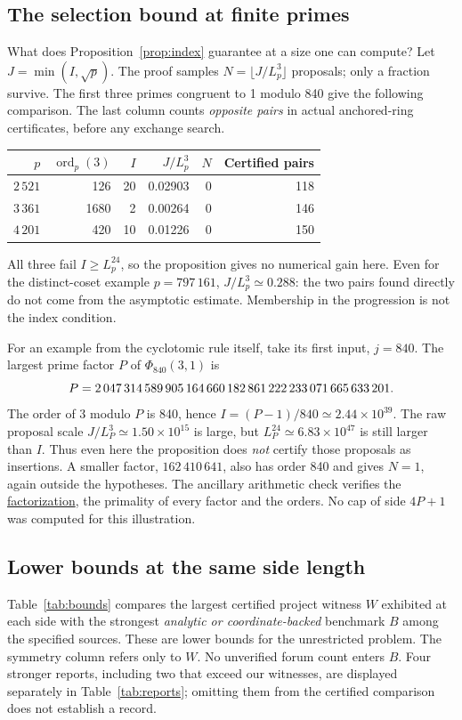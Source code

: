 \subsection{The selection bound at finite primes}\label{sec:scale}
What does Proposition~\ref{prop:index} guarantee at a size one can compute? Let $J=\min(I,\sqrt p)$. The proof samples $N=\lfloor J/L_p^3\rfloor$ proposals; only a fraction survive. The first three primes congruent to 1 modulo 840 give the following comparison. The last column counts \emph{opposite pairs} in actual anchored-ring certificates, before any exchange search.
\begin{center}\small
\begin{tabular}{@{}rrrrrr@{}}\toprule
$p$ & $\operatorname{ord}_p(3)$ & $I$ & $J/L_p^3$ & $N$ & Certified pairs \\ \midrule
$2\,521$ & 126  & 20 & 0.02903 & 0 & 118 \\
$3\,361$ & 1680 &  2 & 0.00264 & 0 & 146 \\
$4\,201$ & 420  & 10 & 0.01226 & 0 & 150 \\ \bottomrule
\end{tabular}\end{center}
All three fail $I\ge L_p^{24}$, so the proposition gives no numerical gain here. Even for the distinct-coset example $p=797\,161$, $J/L_p^3\simeq0.288$: the two pairs found directly do not come from the asymptotic estimate. Membership in the progression is not the index condition.

For an example from the cyclotomic rule itself, take its first input, $j=840$. The largest prime factor $P$ of $\Phi_{840}(3,1)$ is
\[
 \mathcopy{P = 2047314589905164660182861222233071665633201.}{P=2\,047\,314\,589\,905\,164\,660\,182\,861\,222\,233\,071\,665\,633\,201.}
\]
The order of 3 modulo $P$ is 840, hence $I=(P-1)/840\simeq2.44\times10^{39}$. The raw proposal scale $J/L_P^3\simeq1.50\times10^{15}$ is large, but $L_P^{24}\simeq6.83\times10^{47}$ is still larger than $I$. Thus even here the proposition does \emph{not} certify those proposals as insertions. A smaller factor, $162\,410\,641$, also has order 840 and gives $N=1$, again outside the hypotheses. The ancillary arithmetic check verifies the \href{https://factordb.com/index.php?id=1100000000498735166}{factorization}, the primality of every factor and the orders. No cap of side $4P+1$ was computed for this illustration.

\subsection{Lower bounds at the same side length}
Table~\ref{tab:bounds} compares the largest certified project witness $W$ exhibited at each side with the strongest \emph{analytic or coordinate-backed} benchmark $B$ among the specified sources. These are lower bounds for the unrestricted problem. The symmetry column refers only to $W$. No unverified forum count enters $B$. Four stronger reports, including two that exceed our witnesses, are displayed separately in Table~\ref{tab:reports}; omitting them from the certified comparison does not establish a record.

